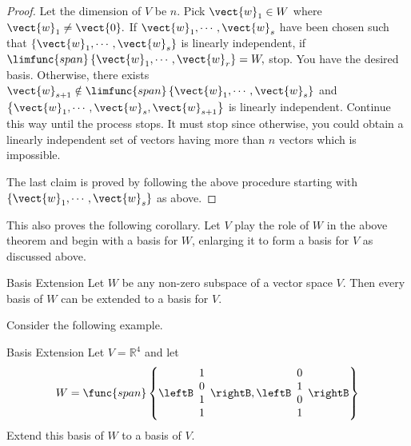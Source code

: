 \begin{proof}
Let the dimension of $V$ be $n$. Pick $\vect{w}_{1}\in W$
where $\vect{w}_{1}\neq \vect{0}.$ If $\vect{w}_{1},\cdots ,\vect{w}_{s}$ have
been chosen such that $\left\{ \vect{w}_{1},\cdots ,\vect{w}_{s}\right\} $ is
linearly independent, if $\limfunc{span}\left\{ \vect{w}_{1},\cdots ,\vect{w}
_{r}\right\} =W,$ stop. You have the desired basis. Otherwise, there exists $
\vect{w}_{s+1}\notin \limfunc{span}\left\{ \vect{w}_{1},\cdots ,\vect{w}
_{s}\right\} $ and $\left\{ \vect{w}_{1},\cdots ,
\vect{w}_{s},\vect{w}_{s+1}\right\} $ is linearly independent. Continue this
way until the process stops. It must stop since otherwise, you could obtain a
linearly independent set of vectors having more than $n$ vectors which is
impossible.

The last claim is proved by following the above procedure starting with $
\left\{ \vect{w}_{1},\cdots ,\vect{w}_{s}\right\} $ as above. 
\end{proof}

This also proves the following corollary. Let $V$ play the role of $
W$ in the above theorem and begin with a basis for $W$, enlarging it to form
a basis for $V$ as discussed above.

\begin{corollary}{Basis Extension}
Let $W$ be any non-zero subspace of a vector space $V$.
Then every basis of $W$ can be extended to a basis for $V$.
\end{corollary}

Consider the following example.

\begin{example}{Basis Extension}
Let $V=\mathbb{R}^{4}$ and let 
\begin{equation*}
W=\func{span}\left\{ \leftB 
\begin{array}{c}
1 \\ 
0 \\ 
1 \\ 
1
\end{array}
\rightB ,\leftB 
\begin{array}{c}
0 \\ 
1 \\ 
0 \\ 
1
\end{array}
\rightB \right\}
\end{equation*}
Extend this basis of $W$ to a basis of $V$.
\end{example}

